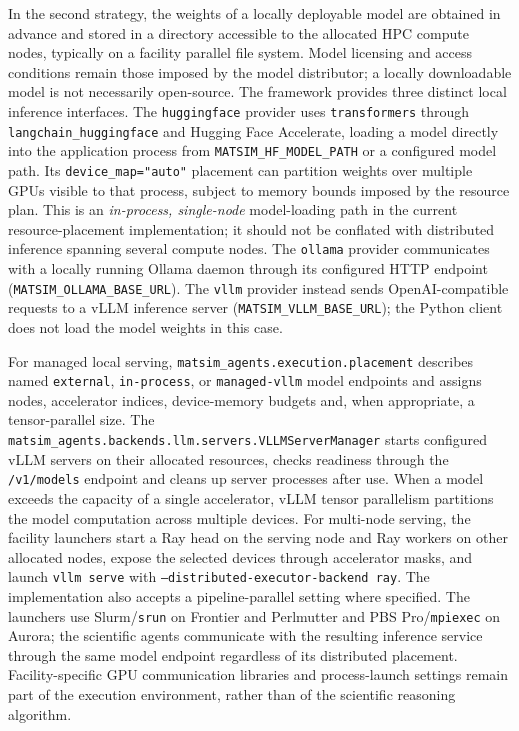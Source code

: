 \documentclass[11pt,a4paper]{article}
\begin{document}
In the second strategy, the weights of a locally deployable model are obtained in advance and stored in a directory accessible to the allocated HPC compute nodes, typically on a facility parallel file system. Model licensing and access conditions remain those imposed by the model distributor; a locally downloadable model is not necessarily open-source. The framework provides three distinct local inference interfaces. The \texttt{huggingface} provider uses \texttt{transformers} through \texttt{langchain\_huggingface} and Hugging Face Accelerate, loading a model directly into the application process from \texttt{MATSIM\_HF\_MODEL\_PATH} or a configured model path. Its \texttt{device\_map="auto"} placement can partition weights over multiple GPUs visible to that process, subject to memory bounds imposed by the resource plan. This is an \emph{in-process, single-node} model-loading path in the current resource-placement implementation; it should not be conflated with distributed inference spanning several compute nodes. The \texttt{ollama} provider communicates with a locally running Ollama daemon through its configured HTTP endpoint (\texttt{MATSIM\_OLLAMA\_BASE\_URL}). The \texttt{vllm} provider instead sends OpenAI-compatible requests to a vLLM inference server (\texttt{MATSIM\_VLLM\_BASE\_URL}); the Python client does not load the model weights in this case.

For managed local serving, \texttt{matsim\_agents.execution.placement} describes named \texttt{external}, \texttt{in-process}, or \texttt{managed-vllm} model endpoints and assigns nodes, accelerator indices, device-memory budgets and, when appropriate, a tensor-parallel size. The \texttt{matsim\_agents.backends.llm.servers.VLLMServerManager} starts configured vLLM servers on their allocated resources, checks readiness through the \texttt{/v1/models} endpoint and cleans up server processes after use. When a model exceeds the capacity of a single accelerator, vLLM tensor parallelism partitions the model computation across multiple devices. For multi-node serving, the facility launchers start a Ray head on the serving node and Ray workers on other allocated nodes, expose the selected devices through accelerator masks, and launch \texttt{vllm serve} with \texttt{--distributed-executor-backend ray}. The implementation also accepts a pipeline-parallel setting where specified. The launchers use Slurm/\texttt{srun} on Frontier and Perlmutter and PBS Pro/\texttt{mpiexec} on Aurora; the scientific agents communicate with the resulting inference service through the same model endpoint regardless of its distributed placement. Facility-specific GPU communication libraries and process-launch settings remain part of the execution environment, rather than of the scientific reasoning algorithm.
\end{document}

